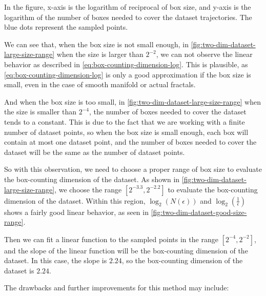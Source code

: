 
In the figure, x-axis is the logarithm of reciprocal of box size, and y-axis is the logarithm of the number of boxes needed to cover the dataset trajectories.
The blue dots represent the sampled points.

We can see that, when the box size is not small enough, in \cref{fig:two-dim-dataset-large-size-range} when the size is larger than $2^{-2}$, we can not observe the linear behavior as described in \cref{eq:box-counting-dimension-log}.
This is plausible, as \cref{eq:box-counting-dimension-log} is only a good approximation if the box size is small, even in the case of smooth manifold or actual fractals.

And when the box size is too small, in \cref{fig:two-dim-dataset-large-size-range} when the size is smaller than $2^{-4}$, the number of boxes needed to cover the dataset tends to a constant.
This is due to the fact that we are working with a finite number of dataset points, so when the box size is small enough, each box will contain at most one dataset point, and the number of boxes needed to cover the dataset will be the same as the number of dataset points.

So with this observation, we need to choose a proper range of box size to evaluate the box-counting dimension of the dataset.
As shown in \cref{fig:two-dim-dataset-large-size-range}, we choose the range $[2^{-3.3}, 2^{-2.2}]$ to evaluate the box-counting dimension of the dataset.
Within this region, $\log_2\left(N(\epsilon)\right)$ and $\log_2\left(\frac{1}{\epsilon}\right)$ shows a fairly good linear behavior, as seen in \cref{fig:two-dim-dataset-good-size-range}.


Then we can fit a linear function to the sampled points in the range $[2^{-4}, 2^{-2}]$, and the slope of the linear function will be the box-counting dimension of the dataset.
In this case, the slope is $2.24$, so the box-counting dimension of the dataset is $2.24$.

The drawbacks and further improvements for this method may include:

